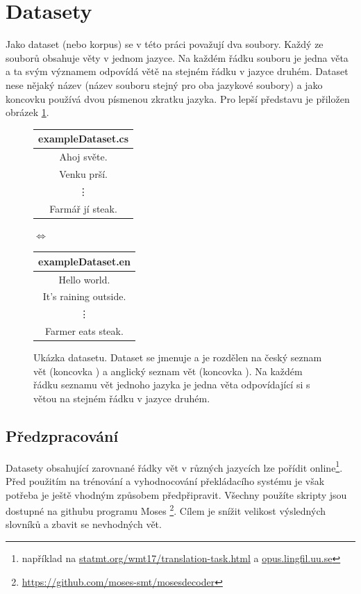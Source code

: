 \section{Datasety}\label{section:datasets}
Jako dataset (nebo korpus) se v této práci považují dva soubory. Každý ze souborů obsahuje věty v jednom jazyce. Na každém řádku souboru je jedna věta a ta svým významem odpovídá větě na stejném řádku v jazyce druhém. Dataset nese nějaký název (název souboru stejný pro oba jazykové soubory) a jako koncovku používá dvou písmenou zkratku jazyka. Pro lepší představu je přiložen obrázek \ref{img:dataset}.

\begin{figure}[H]
    \begin{center}
        \begin{tabular}{|c|}
          \hline
          exampleDataset.cs\\
          \hline
          Ahoj světe. \\
          Venku prší. \\
          \vdots \\
          Farmář jí steak. \\
          \hline
        \end{tabular}
        $\Longleftrightarrow$
        \begin{tabular}{|c|}
          \hline
          exampleDataset.en\\
          \hline
          Hello world. \\
          It's raining outside. \\
          \vdots \\
          Farmer eats steak. \\
          \hline
        \end{tabular}
    \end{center}
	\caption{Ukázka datasetu. Dataset se jmenuje  a je rozdělen na český seznam vět (koncovka ) a anglický seznam vět (koncovka ). Na každém řádku seznamu vět jednoho jazyka je jedna věta odpovídající si s větou na stejném řádku v jazyce druhém.}
	\label{img:dataset}
\end{figure}

\subsection{Předzpracování} \label{subsection:preparing}
Datasety obsahující zarovnané řádky vět v různých jazycích lze pořídit online\footnote{například na \url{statmt.org/wmt17/translation-task.html} a \url{opus.lingfil.uu.se}}. Před použitím na trénování a vyhodnocování překládacího systému je však potřeba je ještě vhodným způsobem předpřipravit. Všechny použíte skripty jsou dostupné na githubu programu Moses \footnote{\url{https://github.com/moses-smt/mosesdecoder}}. Cílem je snížit velikost výsledných slovníků a zbavit se nevhodných vět.

